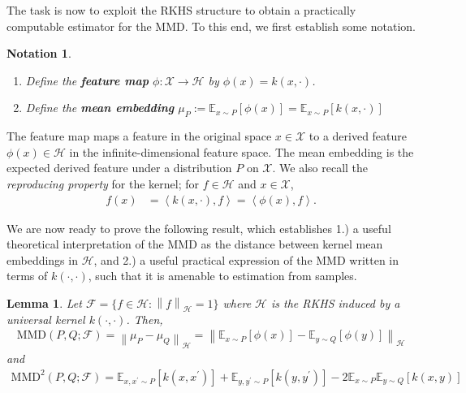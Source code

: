 \documentclass[12pt]{article}
\newcommand*{\norm}[1]{\left\lVert#1\right\rVert}
\newcommand{\E}{\mathbb{E}}
\newcommand{\featureMap}{\phi}
\newcommand{\RKHS}{\mathcal{H}}
\newcommand{\Ker}{k}
\newcommand{\dataSpace}{\mathcal{X}}
\newcommand{\meanEmb}[1]{\mu_{#1}}
\newcommand{\MMD}{\text{MMD}}
\newcommand{\MMDSpace}{\mathcal{F}}
\newtheorem{lemma}{Lemma}
\newtheorem{notation}{Notation}
\begin{document}
The task is now to exploit the RKHS structure to obtain a practically computable estimator for the MMD. To this end, we first establish some notation. 
\begin{notation}
\begin{enumerate}
Let $\Ker(\cdot, \cdot)$ be a kernel with associated RKHS $\RKHS$.
	\item Define the \textbf{feature map} $\featureMap: \dataSpace \to \RKHS$ by $\featureMap(x) = \Ker(x, \cdot)$. 
	\item Define the \textbf{mean embedding} $\meanEmb{P} := \E_{x \sim P}\left[\featureMap(x) \right] = \E_{x \sim P}\left[\Ker(x, \cdot) \right] $
\end{enumerate}
\end{notation}
The feature map maps a feature in the original space $x \in \dataSpace$ to a derived feature $\featureMap(x) \in \RKHS$ in the infinite-dimensional feature space. 
The mean embedding is the expected derived feature under a distribution $P$ on $\dataSpace$. We also recall the \textit{reproducing property} for the kernel; for 
$f \in \RKHS$ and $x \in \dataSpace$, 
\begin{align}
f(x) &= \left\langle \Ker(x, \cdot), f \right\rangle = \left\langle \featureMap(x), f \right\rangle.
\end{align}

We are now ready to prove the following result, which establishes 1.) a useful theoretical interpretation of the MMD as the distance between kernel mean embeddings in 
$\RKHS$, and 2.) a useful practical expression of the MMD written in terms of $\Ker(\cdot, \cdot)$, such that it is amenable to estimation from samples. 

\begin{lemma} 
Let $\MMDSpace = \{f \in \RKHS: \norm{f}_{\RKHS} = 1\}$ where $\RKHS$ is the RKHS induced by a universal kernel $\Ker(\cdot, \cdot)$. Then, 
\begin{align}
\MMD(P, Q; \MMDSpace) = \norm{\meanEmb{P} - \meanEmb{Q}}_{\RKHS} = \norm{\E_{x \sim P}[\featureMap(x)] - \E_{y \sim Q}[\featureMap(y)]}_{\RKHS} \label{MMD_mean_embedding}
\end{align}
and
\begin{align}
\MMD^2(P, Q; \MMDSpace) = \E_{x, x^\prime \sim P}\left[\Ker(x, x^\prime)\right] + \E_{y, y^\prime \sim P}\left[\Ker(y, y^\prime)\right] - 2 \E_{x \sim P}\E_{y \sim Q} \left[\Ker(x, y)\right] \label{MMD_kernel}
\end{align}
\end{lemma}
\end{document}

